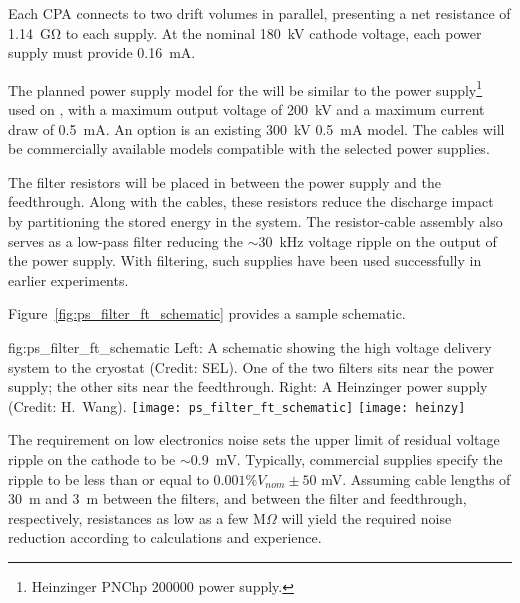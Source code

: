 Each CPA connects to two drift volumes in parallel, presenting a net resistance of \SI{1.14}{\giga\ohm} to each supply. At the nominal \SI{180}{kV} cathode voltage, each power supply must provide \SI{0.16}{mA}.

The planned power supply model for the  will be similar to the power supply\footnote{Heinzinger\texttrademark{} PNChp 200000 power supply.} used on , with a maximum output voltage of \SI{200}{kV} and a maximum current draw of \SI{0.5}{mA}.  An %
option is an existing \SI{300}{kV} \SI{0.5}{mA} model. 
The  cables will be commercially available models compatible with the selected power supplies. 


The filter resistors will be placed in between the power supply and the feedthrough.  Along with the cables, these resistors reduce the discharge impact by partitioning the stored energy in the system.  The resistor-cable assembly also serves as a low-pass filter reducing the $\sim$\SI{30}{kHz} voltage ripple on the output of the power supply.  With filtering, such supplies have been used successfully in earlier experiments.

Figure~\ref{fig:ps_filter_ft_schematic} provides a sample schematic.

\begin{dunefigure}{fig:ps_filter_ft_schematic}
{Left:  A schematic showing the high voltage delivery system to the cryostat (Credit:  SEL).%
One of the two filters sits near the power supply; the other sits near the feedthrough. Right:  %
A Heinzinger power supply (Credit: H.~Wang).}
\texttt{[image: ps\_filter\_ft\_schematic]}
\texttt{[image: heinzy]}
\end{dunefigure}
The requirement %
on low electronics noise sets the upper limit of residual voltage ripple on the cathode to be $\sim$\SI{0.9}{mV}.  Typically, commercial supplies %
specify the ripple to be less than or equal to $0.001\%V_{nom} \pm 50$ mV.  Assuming cable lengths of \SI{30}{m} and \SI{3}{m} between the filters, and between the filter and feedthrough, respectively, resistances as low as a few M$\Omega$ will yield the required noise reduction according to calculations and experience. %

